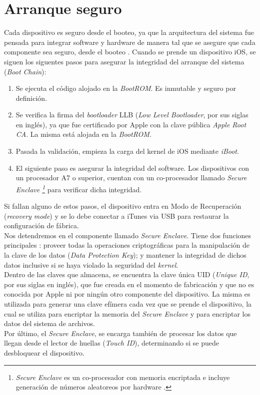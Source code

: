 \section{Arranque seguro}\label{fig:ch02:arranque}
Cada dispositivo es seguro desde el booteo, ya que la arquitectura del sistema fue pensada para integrar software y hardware de manera tal que se asegure que cada componente sea seguro, desde el booteo \cite{asg}. Cuando se prende un dispositivo iOS, se siguen los siguentes pasos para asegurar la integridad del arranque del sistema (\textit{Boot Chain}):
\begin{enumerate}
	\item Se ejecuta el código alojado en la \textit{BootROM}. Es inmutable y seguro por definición.
	\item Se verifica la firma del \textit{bootloader} LLB (\textit{Low Level Bootloader}, por sus siglas en ingl\'es), ya que fue certificado por Apple con la clave pública \textit{Apple Root CA}. La misma está alojada en la \textit{BootROM}. 
	\item Pasada la validación, empieza la carga del kernel de iOS mediante \textit{iBoot}.
	\item El siguiente paso es asegurar la integridad del software. Los dispositivos con un procesador A7 o superior, cuentan con un co-procesador llamado \textit{Secure Enclave \footnote{\textit{Secure Enclave} es un co-procesador con memoria encriptada e incluye generación de números aleatoreos por hardware \cite{asg}.}} para verificar dicha integridad.
\end{enumerate}
Si fallan alguno de estos pasos, el dispositivo entra en Modo de Recuperación (\textit{recovery mode}) y se lo debe conectar a iTunes via USB para restaurar la configuración de fábrica.\\
Nos detendremos en el componente llamado \textit{Secure Enclave}. Tiene dos funciones principales \cite{asg}: proveer todas la operaciones criptográficas para la manipulación de la clave de los datos (\textit{Data Protection Key}); y mantener la integridad de dichos datos inclusive si se haya violado la seguridad del \textit{kernel}.\\
Dentro de las claves que almacena, se encuentra la clave única UID (\textit{Unique ID}, por sus siglas en ingl\'es), que fue creada en el momento de fabricación y que no es conocida por Apple ni por ningún otro componente del dispositivo. La misma es utilizada para generar una clave efímera cada vez que se prende el dispositivo, la cual se utiliza para encriptar la memoria del \textit{Secure Enclave} y para encriptar los datos del sistema de archivos.\\
Por último, el \textit{Secure Enclave}, se encarga también de procesar los datos que llegan desde el lector de huellas (\textit{Touch ID}), determinando si se puede desbloquear el dispositivo.
